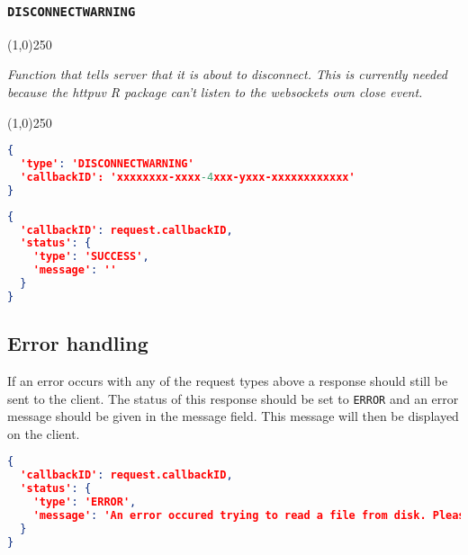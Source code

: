 \documentclass[A4,12pt, utf8]{article}
\begin{document}
\subsubsection{\texttt{DISCONNECTWARNING}}
\begin{center}
  \line(1,0){250}

  \textit{Function that tells server that it is about to disconnect. This is currently needed because the httpuv R package can't listen to the websockets own close event.}

  \line(1,0){250}
\end{center}


\begin{lstlisting}[caption=Request content, language=json]
{
  'type': 'DISCONNECTWARNING'
  'callbackID': 'xxxxxxxx-xxxx-4xxx-yxxx-xxxxxxxxxxxx'
}
\end{lstlisting}

\begin{lstlisting}[caption=response content, language=json]
{
  'callbackID': request.callbackID,
  'status': {
    'type': 'SUCCESS',
    'message': ''
  }
}
\end{lstlisting}



\subsection{Error handling}

If an error occurs with any of the request types above a response should still be sent to the client. The status of this response should be set to \texttt{ERROR} and an error message should be given in the message field. This message will then be displayed on the client.

\begin{lstlisting}[caption=ERROR response content, language=json]
{
  'callbackID': request.callbackID,
  'status': {
    'type': 'ERROR',
    'message': 'An error occured trying to read a file from disk. Please make sure: /path/to/file exists or check the config...
  }
}
\end{lstlisting}
\end{document}
